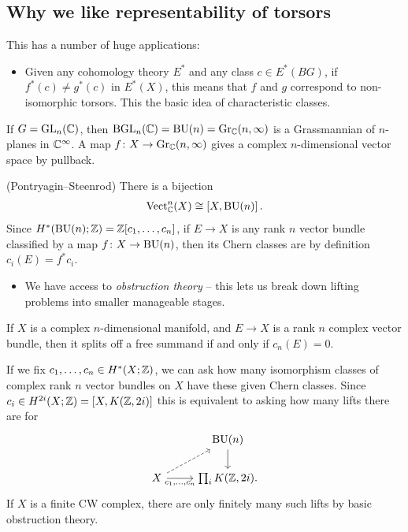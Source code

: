 \documentclass[11pt]{amsart}
\begin{document}
\subsection{Why we like representability of torsors}





This has a number of huge applications:
\begin{itemize}
    \item Given any cohomology theory $E^\ast$ and any class $c\in E^\ast(BG)$, if $f^\ast(c) \ne g^\ast(c)$ in $E^\ast(X)$, this means that $f$ and $g$ correspond to non-isomorphic torsors. This the basic idea of characteristic classes.
\end{itemize}

\begin{example} If $G = \mathrm{GL}_n(\mathbb{C})$, then $\mathrm{BGL}_n(\mathbb{C}) = \mathrm{BU}(n) = \mathrm{Gr}_{\mathbb{C}}(n,\infty)$ is a Grassmannian of $n$-planes in $\mathbb{C}^\infty$. A map $f \colon X \to \mathrm{Gr}_{\mathbb{C}}(n,\infty)$ gives a complex $n$-dimensional vector space by pullback.
\end{example}

\begin{theorem} (Pontryagin--Steenrod) There is a bijection
\begin{align*}
    \mathrm{Vect}_{\mathbb{C}}^n(X) \cong \left[ X, \mathrm{BU}(n) \right].
\end{align*}
Since $H^\ast(\mathrm{BU}(n);\mathbb{Z}) = \mathbb{Z}[c_1, \ldots, c_n]$, if $E \to X$ is any rank $n$ vector bundle classified by a map $f \colon X \to \mathrm{BU}(n)$, then its Chern classes are by definition $c_i(E) = f^\ast c_i$.
\end{theorem}

\begin{itemize}
    \item We have access to \textit{obstruction theory} -- this lets us break down lifting problems into smaller manageable stages.
\end{itemize}

\begin{example} If $X$ is a complex $n$-dimensional manifold, and $E \to X$ is a rank $n$ complex vector bundle, then it splits off a free summand if and only if $c_n(E) = 0$.
\end{example}

\begin{example} If we fix $c_1, \ldots, c_n \in H^{\ast}(X;\mathbb{Z})$, we can ask how many isomorphism classes of complex rank $n$ vector bundles on $X$ have these given Chern classes. Since $c_i \in H^{2i}(X;\mathbb{Z}) = \left[ X, K(\mathbb{Z},2i) \right]$ this is equivalent to asking how many lifts there are for
\[ \begin{tikzcd}
     & \BU(n)\dar\\
    X\ar[ur,dashed]\rar["{c_1, \ldots, c_n}" below] & {\prod_i K(\Z,2i)}.
\end{tikzcd} \]
If $X$ is a finite CW complex, there are only finitely many such lifts by basic obstruction theory.
\end{example}
\end{document}
